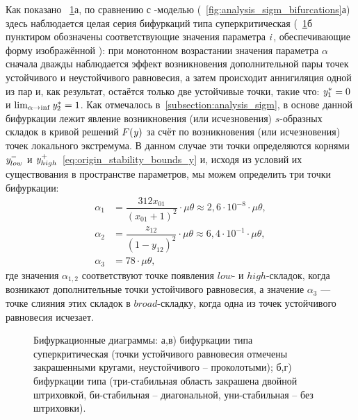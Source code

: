 Как показано \onfigure~\ref{fig:analysis_origin_bifurcations}а, по сравнению с -моделью (\seefigure~\ref{fig:analysis_sigm_bifurcations}а) здесь наблюдается целая серия бифуркаций типа суперкритическая  (\onfigure~\ref{fig:analysis_origin_bifurcations}б пунктиром обозначены соответствующие значения параметра $\mathit{i}$, обеспечивающие форму изображённой ): при монотонном возрастании значения параметра $\alpha$ сначала дважды наблюдается эффект возникновения дополнительной пары точек устойчивого и неустойчивого равновесия, а затем происходит аннигиляция одной из пар и, как результат, остаётся только две устойчивые точки, такие что: $\mathit{y}^{*}_{1} = 0$ и $\lim_{\alpha \to \inf} \mathit{y}^{*}_{2} = 1$. Как отмечалось в~\autoref{subsection:analysis_sigm}, в основе данной бифуркации лежит явление возникновения (или исчезновения) $s$-образных складок в кривой решений $F(\mathit{y})$ за счёт по возникновения (или исчезновения) точек локального экстремума. В данном случае эти точки определяются корнями $\mathit{y}^{-}_{low}$ и $\mathit{y}^{+}_{high}$~\eqref{eq:origin_stability_bounds_y} и, исходя из условий их существования в пространстве параметров, мы можем определить три точки бифуркации:
\begin{equation}
    \label{eq:origin_bifurcation_alpha}
    \begin{aligned}
        \alpha_{1} &= \dfrac{312 x_{01}}{(x_{01} + 1)^2} \cdot \mu \theta \approx 2,6 \cdot 10^{-8} \cdot \mu \theta, \\
        \alpha_{2} &= \dfrac{z_{12}}{(1 - y_{12})^2} \cdot \mu \theta \approx 6,4 \cdot 10^{-1} \cdot \mu \theta, \\
        \alpha_{3} &= 78 \cdot \mu \theta, 
    \end{aligned}
\end{equation}
где значения $\alpha_{1,2}$ соответствуют точке появления $low$- и $high$-складок, когда возникают дополнительные точки устойчивого равновесия, а значение $\alpha_{3}$ --- точке слияния этих складок в $broad$-складку, когда одна из точек устойчивого равновесия исчезает.

\begin{figure}[t]
    \caption{Бифуркационные диаграммы: а,в) бифуркации типа суперкритическая  (точки устойчивого равновесия отмечены закрашенными кругами, неустойчивого -- проколотыми); б,г) бифуркации типа  (три-стабильная область закрашена двойной штриховкой, би-стабильная -- диагональной, уни-стабильная -- без штриховки).}
    \label{fig:analysis_origin_bifurcations}
\end{figure}

